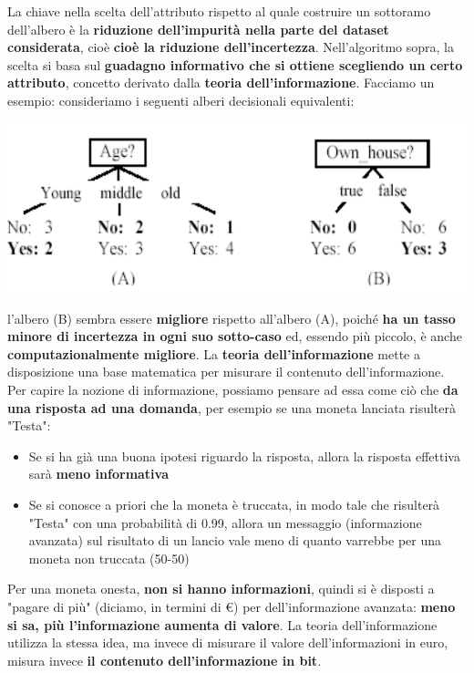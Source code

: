 \documentclass[12pt]{article}
\begin{document}
La chiave nella scelta dell'attributo rispetto al quale costruire un sottoramo dell'albero è la \textbf{riduzione dell'impurità nella parte del dataset considerata}, cioè \textbf{cioè la riduzione dell'incertezza}.
Nell'algoritmo sopra, la scelta si basa sul \textbf{guadagno informativo che si ottiene scegliendo un certo attributo}, concetto derivato dalla \textbf{teoria dell'informazione}. Facciamo un esempio: consideriamo i seguenti alberi decisionali equivalenti:
\begin{center}
    \includegraphics[width =1\linewidth]{Images/74.PNG}
\end{center}
l'albero (B) sembra essere \textbf{migliore} rispetto all'albero (A), poiché \textbf{ha un tasso minore di incertezza in ogni suo sotto-caso} ed, essendo più piccolo, è anche \textbf{computazionalmente migliore}.
La \textbf{teoria dell'informazione} mette a disposizione una base matematica per misurare il contenuto dell'informazione.
Per capire la nozione di informazione, possiamo pensare ad essa come ciò che \textbf{da una risposta ad una domanda}, per esempio se una moneta lanciata risulterà "Testa":
\begin{itemize}
    \item Se si ha già una buona ipotesi riguardo la risposta, allora la risposta effettiva sarà \textbf{meno informativa}
    \item Se si conosce a priori che la moneta è truccata, in modo tale che risulterà "Testa" con una probabilità di 0.99, allora un messaggio (informazione avanzata) sul risultato di un lancio vale meno di quanto varrebbe per una moneta non truccata (50-50)
\end{itemize}
Per una moneta onesta, \textbf{non si hanno informazioni}, quindi si è disposti a "pagare di più" (diciamo, in termini di €) per dell'informazione avanzata: \textbf{meno si sa, più l'informazione aumenta di valore}.
La teoria dell'informazione utilizza la stessa idea, ma invece di misurare il valore dell'informazioni in euro, misura invece \textbf{il contenuto dell'informazione in bit}.
\end{document}
